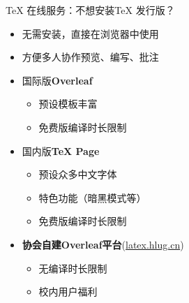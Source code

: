 \begin{frame}{\TeX{} 在线服务：不想安装\TeX{} 发行版？}
  \begin{itemize}
    \item 无需安装，直接在浏览器中使用
    \item<+-> 方便多人协作预览、编写、批注
    \item<+-> 国际版\textbf{Overleaf} 
      \begin{itemize}
        \item 预设模板丰富
        \item 免费版编译时长限制
      \end{itemize}
    \item<+-> 国内版\textbf{\TeX{} Page} 
      \begin{itemize}
        \item 预设众多中文字体
        \item 特色功能（暗黑模式等）
        \item 免费版编译时长限制
      \end{itemize}
    \item<+-> \textbf{协会自建Overleaf平台}(\url{latex.hlug.cn})
      \begin{itemize}
        \item 无编译时长限制
        \item 校内用户福利
      \end{itemize}
  \end{itemize}
\end{frame}
